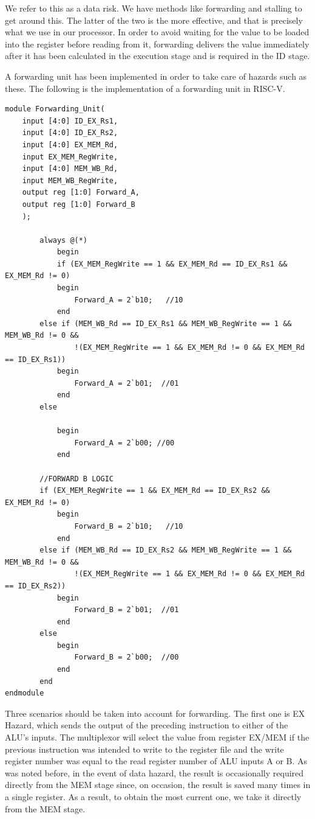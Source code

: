 \documentclass{article}
\begin{document}
We refer to this as a data risk. We have methods like forwarding and stalling to get around this. The latter of the two is the more effective, and that is precisely what we use in our processor. In order to avoid waiting for the value to be loaded into the register before reading from it, forwarding delivers the value immediately after it has been calculated in the execution stage and is required in the ID stage.

A forwarding unit has been implemented in order to take care of hazards such as these. The following is the implementation of a forwarding unit in RISC-V. 

\begin{lstlisting}[caption={Forwarding Unit}, captionpos=b, language=RISC-V]
module Forwarding_Unit(
    input [4:0] ID_EX_Rs1,
    input [4:0] ID_EX_Rs2,
    input [4:0] EX_MEM_Rd,
    input EX_MEM_RegWrite,
    input [4:0] MEM_WB_Rd,
    input MEM_WB_RegWrite,
    output reg [1:0] Forward_A,
    output reg [1:0] Forward_B
    );
    
        always @(*)
            begin
            if (EX_MEM_RegWrite == 1 && EX_MEM_Rd == ID_EX_Rs1 && EX_MEM_Rd != 0)
            begin
                Forward_A = 2`b10;   //10
            end
        else if (MEM_WB_Rd == ID_EX_Rs1 && MEM_WB_RegWrite == 1 && MEM_WB_Rd != 0 &&
                !(EX_MEM_RegWrite == 1 && EX_MEM_Rd != 0 && EX_MEM_Rd == ID_EX_Rs1))
            begin
                Forward_A = 2`b01;  //01
            end
        else

            begin
                Forward_A = 2`b00; //00
            end

        //FORWARD B LOGIC
        if (EX_MEM_RegWrite == 1 && EX_MEM_Rd == ID_EX_Rs2 && EX_MEM_Rd != 0)
            begin
                Forward_B = 2`b10;   //10
            end
        else if (MEM_WB_Rd == ID_EX_Rs2 && MEM_WB_RegWrite == 1 && MEM_WB_Rd != 0 &&
                !(EX_MEM_RegWrite == 1 && EX_MEM_Rd != 0 && EX_MEM_Rd == ID_EX_Rs2))
            begin
                Forward_B = 2`b01;  //01
            end
        else  
            begin
                Forward_B = 2`b00;  //00
            end
        end
endmodule
\end{lstlisting}

Three scenarios should be taken into account for forwarding. The first one is EX Hazard, which sends the output of the preceding instruction to either of the ALU's inputs. The multiplexor will select the value from register EX/MEM if the previous instruction was intended to write to the register file and the write register number was equal to the read register number of ALU inputs A or B. As was noted before, in the event of data hazard, the result is occasionally required directly from the MEM stage since, on occasion, the result is saved many times in a single register. As a result, to obtain the most current one, we take it directly from the MEM stage.
\end{document}
